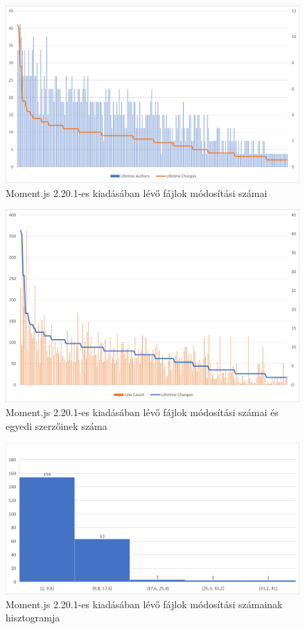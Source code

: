 \begin{figure}[H]
    \centering
    \includegraphics[width=1\textwidth]{images/moment/moment-2.20.5-changes.png}
    \caption{Moment.js 2.20.1-es kiadásában lévő fájlok módosítási számai}
    \label{fig:moment-2.20.1-changes}
\end{figure}

\begin{figure}[H]
    \centering
    \includegraphics[width=1\textwidth]{images/moment/moment-2.20.5-auth.png}
    \caption{Moment.js 2.20.1-es kiadásában lévő fájlok módosítási számai és egyedi szerzőinek száma}
    \label{fig:moment-2.20.1-auth}
\end{figure}

\begin{figure}[H]
    \centering
    \includegraphics[width=1\textwidth]{images/moment/moment-2.20.5-hist.png}
    \caption{Moment.js 2.20.1-es kiadásában lévő fájlok módosítási számainak hisztogramja}
    \label{fig:moment-2.20.1-hist}
\end{figure}

